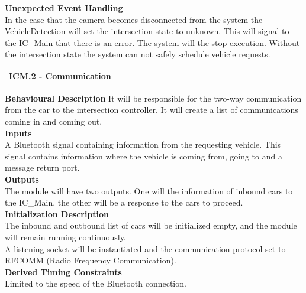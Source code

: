 \documentclass [10pt]{article}
\newcommand{\carSpeed}{1.4\ m/s}
\newcommand{\intersectionLength}{0.6\ m}
\begin{document}
\textbf{Unexpected Event Handling} \\
In the case that the camera becomes disconnected from the system the VehicleDetection will set the intersection state to unknown. This will signal to the IC\_Main that there is an error. The system will the stop execution. Without the intersection state the system can not safely schedule vehicle requests. \\
%





\begin{longtable}{p{}}
\rowcolor{tableCell}\textbf{ICM.2 - Communication} \\
\end{longtable}

\textbf{Behavioural Description} 
 It will be responsible for the two-way communication from the car to the intersection controller. It will create a list of communications coming in and coming out. \\

\textbf{Inputs} \\
  A Bluetooth signal containing information from the requesting vehicle. This signal contains information where the vehicle is coming from, going to and a message return port.\\

\textbf{Outputs} \\
    The module will have two outputs. One will the information of inbound cars to the IC\_Main, the other will be a response to the cars to proceed. \\

\textbf{Initialization Description} \\
    The inbound and outbound list of cars will be initialized empty, and the module will remain running continuously.\\
    A listening socket will be instantiated and the communication protocol set to RFCOMM (Radio Frequency Communication). \\


\textbf{Derived Timing Constraints}\\
    Limited to the speed of the Bluetooth connection.\\
    
\end{document}
